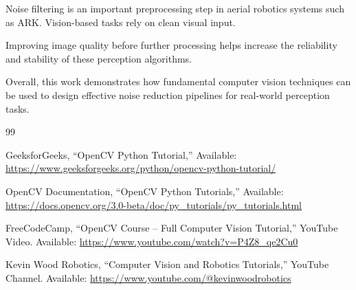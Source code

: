 \documentclass[letterpaper, 10 pt, conference]{ieeeconf}
\begin{document}
Noise filtering is an important preprocessing step in aerial robotics systems such as ARK. Vision-based tasks rely on clean visual input. 

Improving image quality before further processing helps increase the reliability and stability of these perception algorithms.


Overall, this work demonstrates how fundamental computer vision techniques can be used to design effective noise reduction pipelines for real-world perception tasks.



\begin{thebibliography}{99}


GeeksforGeeks, ``OpenCV Python Tutorial,'' Available:
\url{https://www.geeksforgeeks.org/python/opencv-python-tutorial/}

OpenCV Documentation, ``OpenCV Python Tutorials,'' Available:
\url{https://docs.opencv.org/3.0-beta/doc/py_tutorials/py_tutorials.html}

FreeCodeCamp, ``OpenCV Course – Full Computer Vision Tutorial,'' YouTube Video. Available:
\url{https://www.youtube.com/watch?v=P4Z8_qe2Cu0}

Kevin Wood Robotics, ``Computer Vision and Robotics Tutorials,'' YouTube Channel. Available:
\url{https://www.youtube.com/@kevinwoodrobotics}


\end{thebibliography}
\end{document}
